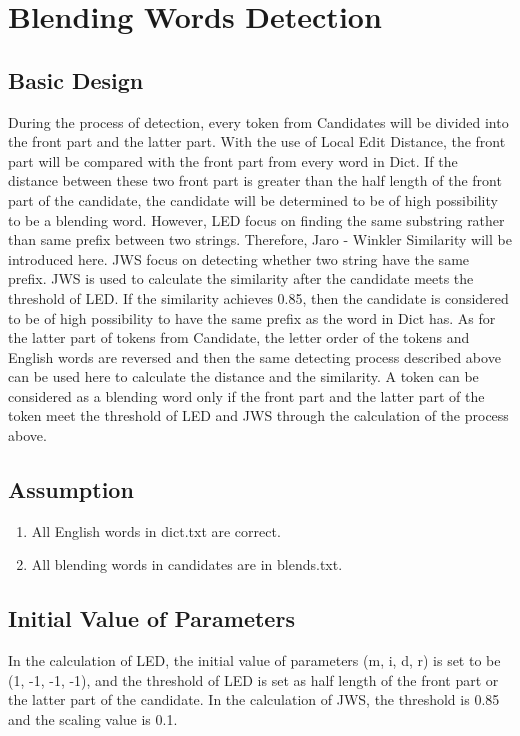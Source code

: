\documentclass[11pt]{article}
\begin{document}
\section{Blending Words Detection}
\subsection{Basic Design}
During the process of detection, every token from Candidates will be divided into the front part and the latter part. With the use of Local Edit Distance, the front part will be compared with the front part from every word in Dict. If the distance between these two front part is greater than the half length of the front part of the candidate, the candidate will be determined to be of high possibility to be a blending word. However, LED focus on finding the same substring rather than same prefix between two strings. Therefore, Jaro - Winkler Similarity will be introduced here. JWS focus on detecting whether two string have the same prefix. JWS is used to calculate the similarity after the candidate meets the threshold of LED. If the similarity achieves 0.85, then the candidate is considered to be of high possibility to have the same prefix as the word in Dict has. As for the latter part of tokens from Candidate, the letter order of the tokens and English words are reversed and then the same detecting process described above can be used here to calculate the distance and the similarity. A token can be considered as a blending word only if the front part and the latter part of the token meet the threshold of LED and JWS through the calculation of the process above.

\subsection{Assumption}
\begin{enumerate}[1. ]
 \item All English words in dict.txt are correct.
 \item All blending words in candidates are in blends.txt.
\end{enumerate}

\subsection{Initial Value of Parameters}
In the calculation of LED, the initial value of parameters (m, i, d, r) is set to be (1, -1, -1, -1), and the threshold of LED is set as half length of the front part or the latter part of the candidate. In the calculation of JWS, the threshold is 0.85 and the scaling value is 0.1.
\end{document}
